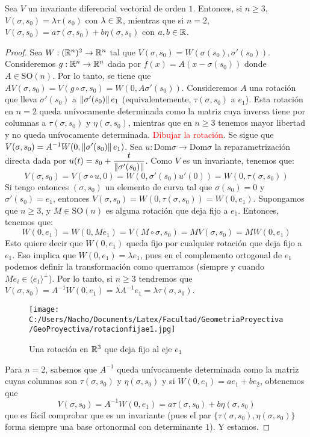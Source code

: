 \begin{prop}
Sea $V$ un invariante diferencial vectorial de orden $1$. Entonces, si $n\geq 3$, $V(\sigma,s_0) = \lambda\tau(s_0)$ con $\lambda\in\mathbb{R}$, mientras que si $n=2$, $V(\sigma,s_0)=a\tau(\sigma,s_0)+b\eta(\sigma,s_0)$ con $a,b\in\mathbb{R}$.
\begin{proof}
Sea $W:(\mathbb{R}^n)^2\to\mathbb{R}^n$ tal que $V(\sigma,s_0)=W(\sigma(s_0),\sigma'(s_0))$. Consideremos $g:\mathbb{R}^n\to\mathbb{R}^n$ dada por $f(x)=A(x-\sigma(s_0))$ donde $A\in\mathrm{SO}(n)$. Por lo tanto, se tiene que $AV(\sigma,s_0)=V(g\circ\sigma,s_0) =W(0,A\sigma'(s_0))$. Consideremos $A$ una rotación que lleva $\sigma'(s_0)$ a $\left\| \sigma'(s_0) \right\|e_1$ (equivalentemente, $\tau(\sigma,s_0)$ a $e_1$). Esta rotación en $n=2$ queda unívocamente determinada como la matriz cuya inversa tiene por columnas a $\tau(\sigma,s_0)$ y $\eta(\sigma,s_0)$, mientras que en $n\geq 3$ tenemos mayor libertad y no queda unívocamente determinada. \textcolor{red}{Dibujar la rotación}. Se sigue que $V(\sigma,s_0) = A^{-1}W(0,\left\| \sigma'(s_0) \right\|e_1)$. Sea $u:\mathrm{Dom}\sigma\to\mathrm{Dom}\sigma$ la reparametrización directa dada por $u(t)=s_0+\dfrac{t}{\left\| \sigma'(s_0) \right\|}$. Como $V$ es un invariante, tenemos que: $$V(\sigma,s_0)=V(\sigma\circ u,0)=W(0,\sigma'(s_0)u'(0)) = W(0,\tau(\sigma,s_0))$$ Si tengo entonces $(\sigma,s_0)$ un elemento de curva tal que $\sigma(s_0)=0$ y $\sigma'(s_0)=e_1$, entonces $V(\sigma,s_0)=W(0,\tau(\sigma,s_0)) = W(0,e_1)$. Supongamos que $n\geq 3$, y $M\in\mathrm{SO}(n)$ es alguna rotación que deja fijo a $e_1$. Entonces, tenemos que: $$W(0,e_1)=W(0,Me_1)=V(M\circ\sigma,s_0)=MV(\sigma,s_0)=MW(0,e_1)$$ Esto quiere decir que $W(0,e_1)$ queda fijo por cualquier rotación que deja fijo a $e_1$. Eso implica que $W(0,e_1)=\lambda e_1$, pues en el complemento ortogonal de $e_1$ podemos definir la transformación como querramos (siempre y cuando $Me_i\in\langle e_1\rangle^{\perp}$). Por lo tanto, si $n\geq 3$ tendremos que $V(\sigma,s_0)=A^{-1}W(0,e_1)=\lambda A^{-1}e_1 = \lambda \tau(\sigma,s_0)$. \begin{figure}[h]
	\centering
		\texttt{[image: C:/Users/Nacho/Documents/Latex/Facultad/GeometriaProyectiva/GeoProyectiva/rotacionfijae1.jpg]}
	\caption{Una rotación en $\mathbb{R}^3$ que deja fijo al eje $e_1$}
	\label{fig:rotacionfijae1}
\end{figure}

Para $n=2$, sabemos que $A^{-1}$ queda unívocamente determinada como la matriz cuyas columnas son $\tau(\sigma,s_0)$ y $\eta(\sigma,s_0)$ y si $W(0,e_1)=ae_1 + be_2$, obtenemos que $$V(\sigma,s_0)=A^{-1}W(0,e_1) = a\tau(\sigma,s_0)+b\eta(\sigma,s_0)$$ que es fácil comprobar que es un invariante (pues el par $\{\tau(\sigma,s_0),\eta(\sigma,s_0)\}$ forma siempre una base ortonormal con determinante $1$). Y estamos.
\end{proof}
\end{prop}

